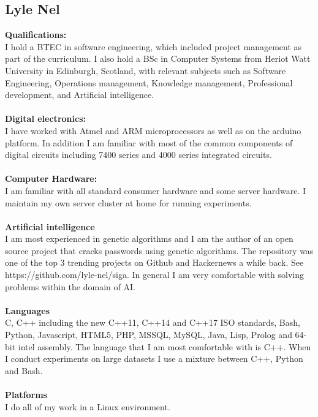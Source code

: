 \documentclass{article}
\begin{document}
\newpage
\subsection {Lyle Nel}
\textbf{Qualifications:} \\

I hold a BTEC in software engineering, which included project management as part of the curriculum.
I also hold a BSc in Computer Systems from Heriot Watt University in Edinburgh, Scotland, with relevant subjects such as Software Engineering, Operations management, Knowledge management, Professional development, and Artificial intelligence.\\ \\
\textbf{Digital electronics:} \\
I have worked with Atmel and ARM microprocessors as well as on the arduino platform. In addition I am familiar with most of the common components of digital circuits including 7400 series and 4000 series integrated circuits. \\ \\
\textbf{Computer Hardware:} \\
I am familiar with all standard consumer hardware and some server hardware. I maintain my own server cluster at home for running experiments. \\ \\
\textbf{Artificial intelligence} \\
I am most experienced in genetic algorithms and I am the author of an open source project that cracks passwords using genetic algorithms. The repository was one of the top 3 trending projects on Github and Hackernews a while back. See https://github.com/lyle-nel/siga. In general I am very comfortable with solving problems within the domain of AI. \\ \\
\textbf{Languages} \\
C, C++ including the new C++11, C++14 and C++17 ISO standards, Bash, Python, Javascript, HTML5, PHP, MSSQL, MySQL, Java, Lisp, Prolog and 64-bit intel assembly. The language that I am most comfortable with is C++. When I conduct experiments on large datasets I use a mixture between C++, Python and Bash. \\ \\
\textbf{Platforms} \\
I do all of my work in a Linux environment.

\newpage
\end{document}
